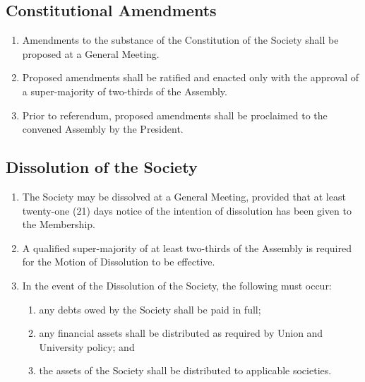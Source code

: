 \documentclass{scrartcl}
\begin{document}
        \subsection{Constitutional Amendments}
            \label{gm--consitutional-amendment}
            \begin{enumerate}
                \item Amendments to the substance of the Constitution of the Society shall be proposed at a General Meeting.
                \item Proposed amendments shall be ratified and enacted only with the approval of a super-majority of two-thirds of the Assembly.
                \item Prior to referendum, proposed amendments shall be proclaimed to the convened Assembly by the President.
            \end{enumerate}

        \subsection{Dissolution of the Society}
            \label{gm--disolution}
            \begin{enumerate}
                \item The Society may be dissolved at a General Meeting, provided that at least twenty-one (21) days notice of the intention of dissolution has been given to the Membership.
                \item A qualified super-majority of at least two-thirds of the Assembly is required for the Motion of Dissolution to be effective.
                \item In the event of the Dissolution of the Society, the following must occur:
                    \begin{enumerate}
                        \item any debts owed by the Society shall be paid in full;
                        \item any financial assets shall be distributed as required by Union and University policy; and
                        \item the assets of the Society shall be distributed to applicable societies.
                    \end{enumerate}
            \end{enumerate}
\end{document}
